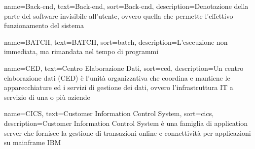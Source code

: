 
%
%



{
    name=Back-end,
    text=Back-end,
    sort=Back-end,
    description={Denotazione della parte del software invisibile all'utente, ovvero quella che permette l'effettivo funzionamento del sistema}
}

{
    name=BATCH,
    text=BATCH,
    sort=batch,
    description={L'esecuzione non immediata, ma rimandata nel tempo di programmi}
}

{
    name=CED,
    text=Centro Elaborazione Dati,
    sort=ced,
    description={Un centro elaborazione dati (CED) è l'unità organizzativa che coordina e mantiene le apparecchiature ed i servizi di gestione dei dati, ovvero l'infrastruttura IT a servizio di una o più aziende}
}

{
    name=CICS,
    text=Customer Information Control System,
    sort=cics,
    description={Customer Information Control System è una famiglia di application server che fornisce la gestione di transazioni online e connettività per applicazioni su mainframe IBM}
}



